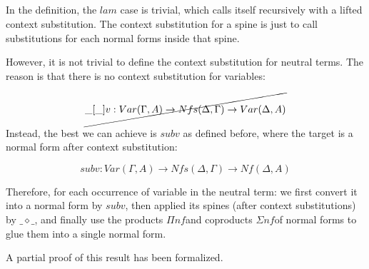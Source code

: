 \begin{code}
\AgdaSpace{}%
\AgdaSpace{}%
\AgdaSpace{}%
\AgdaOperator{\AgdaFunction{[}}\AgdaSpace{}%
\AgdaSpace{}%
\AgdaOperator{\AgdaFunction{]sp}}\AgdaSymbol{)}\<%
\\
%
\\[\AgdaEmptyExtraSkip]%
%
\>[2]\AgdaSpace{}%
\AgdaSymbol{:}\AgdaSpace{}%
\AgdaSpace{}%
\AgdaSpace{}%
\AgdaSpace{}%
\AgdaSpace{}%
\AgdaSpace{}%
\AgdaSpace{}%
\AgdaSpace{}%
\AgdaSpace{}%
\AgdaSpace{}%
\AgdaSpace{}%
\AgdaSpace{}%
\AgdaSpace{}%
\<%
\\
%
\>[2]\AgdaSpace{}%
\AgdaOperator{\AgdaFunction{[}}\AgdaSpace{}%
\AgdaSpace{}%
\AgdaOperator{\AgdaFunction{]sp}}\AgdaSpace{}%
\AgdaSymbol{=}\AgdaSpace{}%
\<%
\\
%
\>[2]\AgdaSymbol{(}\AgdaSpace{}%
\AgdaOperator{\AgdaInductiveConstructor{,}}\AgdaSpace{}%
\AgdaSymbol{)}\AgdaSpace{}%
\AgdaOperator{\AgdaFunction{[}}\AgdaSpace{}%
\AgdaSpace{}%
\AgdaOperator{\AgdaFunction{]sp}}\AgdaSpace{}%
\AgdaSymbol{=}\AgdaSpace{}%
\AgdaSymbol{(}\AgdaSpace{}%
\AgdaOperator{\AgdaFunction{[}}\AgdaSpace{}%
\AgdaSpace{}%
\AgdaOperator{\AgdaFunction{]nf}}\AgdaSymbol{)}\AgdaSpace{}%
\AgdaOperator{\AgdaInductiveConstructor{,}}\AgdaSpace{}%
\AgdaSymbol{(}\AgdaSpace{}%
\AgdaOperator{\AgdaFunction{[}}\AgdaSpace{}%
\AgdaSpace{}%
\AgdaOperator{\AgdaFunction{]sp}}\AgdaSymbol{)}\<%
\end{code}

In the definition, the $lam$ case is trivial, which calls itself recursively with a lifted context substitution. The context substitution for a spine is just to call substitutions for each normal forms inside that spine.

However, it is not trivial to define the context substitution for neutral terms. The reason is that there is no context substitution for variables:

\[ \cancel{\_[\_]v : Var (\Gamma, A) \to Nfs(\Delta, \Gamma) \to Var (\Delta, A)} \]

Instead, the best we can achieve is $subv$ as defined before, where the target is a normal form after context substitution:

\[ subv : Var (\Gamma, A) \to Nfs(\Delta, \Gamma) \to Nf (\Delta, A) \]

Therefore, for each occurrence of variable in the neutral term: we first convert it into a normal form by $subv$, then applied its spines (after context substitutions) by $\_\diamond\_$, and finally use the products $\Pi nf$and coproducts $\Sigma nf$of normal forms to glue them into a single normal form.

A partial proof of this result has been formalized. \hyperref[SCwF]{\faCog}